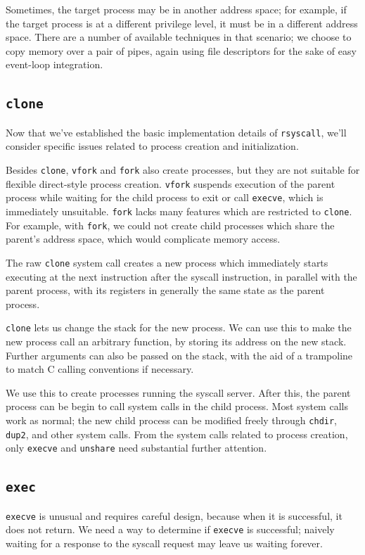 \documentclass[letterpaper,twocolumn,10pt]{article}
\begin{document}
Sometimes, the target process may be in another address space;
for example, if the target process is at a different privilege level,
it must be in a different address space.
There are a number of available techniques in that scenario;
we choose to copy memory over a pair of pipes,
again using file descriptors for the sake of easy event-loop integration.
\subsection{\texttt{clone}}\label{clone}
Now that we've established the basic implementation details of \texttt{rsyscall},
we'll consider specific issues related to process creation and initialization.

Besides \texttt{clone}, \texttt{vfork} and \texttt{fork} also create processes,
but they are not suitable for flexible direct-style process creation.
\texttt{vfork} suspends execution of the parent process
while waiting for the child process to exit or call \texttt{execve},
which is immediately unsuitable.
\texttt{fork} lacks many features which are restricted to \texttt{clone}.
For example, with \texttt{fork},
we could not create child processes which share the parent's address space,
which would complicate memory access.

The raw \texttt{clone} system call creates a new process
which immediately starts executing at the next instruction after the syscall instruction,
in parallel with the parent process,
with its registers in generally the same state as the parent process.

\texttt{clone} lets us change the stack for the new process.
We can use this to make the new process call an arbitrary function,
by storing its address on the new stack.
Further arguments can also be passed on the stack,
with the aid of a trampoline to match C calling conventions if necessary.

We use this to create processes running the syscall server.
After this,
the parent process can be begin to call system calls in the child process.
Most system calls work as normal;
the new child process can be modified freely through \texttt{chdir}, \texttt{dup2}, and other system calls.
From the system calls related to process creation,
only \texttt{execve} and \texttt{unshare} need substantial further attention.
\subsection{\texttt{exec}}\label{execve}
\texttt{execve} is unusual and requires careful design,
because when it is successful, it does not return.
We need a way to determine if \texttt{execve} is successful;
naively waiting for a response to the syscall request may leave us waiting forever.
\end{document}
